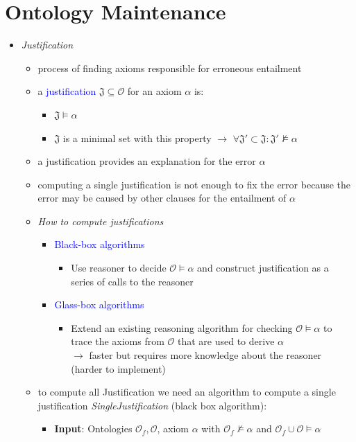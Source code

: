 \documentclass[12pt,a4paper]{article}
\newcommand{\blue}[1]{\textcolor{blue} {#1}}
\newcommand{\ont}{\mathcal{O}}
\begin{document}
\section{Ontology Maintenance}
\begin{itemize}
\item \textit{Justification}
\begin{itemize}
\item process of finding axioms responsible for erroneous entailment
\item a \blue{justification} $\mathfrak{J}\subseteq \ont$ for an axiom $\alpha$ is:
\begin{itemize}
\item $\mathfrak{J}\models\alpha$
\item $\mathfrak{J}$ is a minimal set with this property $\rightarrow$ $\forall \mathfrak{J}' \subset \mathfrak{J} : \mathfrak{J}'\not\models\alpha$
\end{itemize}
\item a justification provides an explanation for the error $\alpha$
\item computing a single justification is not enough to fix the error because the error may be caused by other clauses for the entailment of $\alpha$
\item \textit{How to compute justifications}
\begin{itemize}
\item \blue{Black-box algorithms}
\begin{itemize}
\item Use reasoner to decide $\ont \models \alpha$ and construct justification as a series of calls to the reasoner
\end{itemize}
\item \blue{Glass-box algorithms}
\begin{itemize}
\item Extend an existing reasoning algorithm for checking $\ont \models\alpha$ to trace the axioms from $\ont$  that are used to derive $\alpha$\\$\rightarrow$ faster but requires more knowledge about the reasoner (harder to implement)
\end{itemize}
\end{itemize}
\item to compute all Justification we need an algorithm to compute a single justification \textit{SingleJustification} (black box algorithm):
\begin{itemize}
\item \textbf{Input}: Ontologies $\ont_f, \ont$, axiom $\alpha$ with $\ont_f \not\models\alpha$ and $\ont_f \cup \ont \models \alpha$

\end{itemize}
\end{itemize}
\end{itemize}
\end{document}
